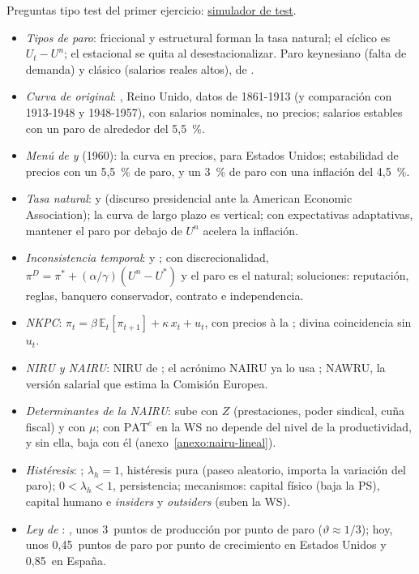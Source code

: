 \documentclass[11pt]{article}
\begin{document}
\begin{anotaciones}
Preguntas tipo test del primer ejercicio: \href{https://www.victorgutierrezmarcos.es/oposicion/temario/primer-ejercicio/test/simulador.html?tema=3.A.28}{simulador de test}.
\end{anotaciones}

\begin{itemize}
\item \emph{Tipos de paro}: friccional y estructural forman la tasa natural; el cíclico es $U_t-U^n$; el estacional se quita al desestacionalizar. Paro keynesiano (falta de demanda) y clásico (salarios reales altos), de .
\item \emph{Curva de  original}: \textcite{Phillips1958}, Reino Unido, datos de 1861-1913 (y comparación con 1913-1948 y 1948-1957), con salarios nominales, no precios; salarios estables con un paro de alrededor del 5,5~\%.
\item \emph{Menú de  y } (1960): la curva en precios, para Estados Unidos; estabilidad de precios con un 5,5~\% de paro, y un 3~\% de paro con una inflación del 4,5~\%.
\item \emph{Tasa natural}: \textcite{Phelps1967Phillips} y \textcite{Friedman1968Role} (discurso presidencial ante la American Economic Association); la curva de largo plazo es vertical; con expectativas adaptativas, mantener el paro por debajo de $U^n$ acelera la inflación.
\item \emph{Inconsistencia temporal}: \textcite{KydlandPrescott1977Rules} y \textcite{BarroGordon1983Positive}; con discrecionalidad, $\pi^D=\pi^*+(\alpha/\gamma)(U^n-U^*)$ y el paro es el natural; soluciones: reputación, reglas, banquero conservador\nocite{Rogoff1985Optimal}, contrato\nocite{Walsh1995Optimal} e independencia.
\item \emph{NKPC}: $\pi_t=\beta\,\mathbb{E}_t[\pi_{t+1}]+\kappa\,x_t+u_t$, con precios à la ; divina coincidencia sin $u_t$\nocite{BlanchardGali2007Real}.
\item \emph{NIRU y NAIRU}: NIRU de \textcite{ModiglianiPapademos1975Targets}; el acrónimo NAIRU ya lo usa \textcite{Tobin1980Stabilization}; NAWRU, la versión salarial que estima la Comisión Europea.
\item \emph{Determinantes de la NAIRU}: sube con $Z$ (prestaciones, poder sindical, cuña fiscal) y con $\mu$; con $\mathrm{PAT}^e$ en la WS no depende del nivel de la productividad, y sin ella, baja con él (anexo~\ref{anexo:nairu-lineal}).
\item \emph{Histéresis}: \textcite{BlanchardSummers1986Hysteresis}; $\lambda_h=1$, histéresis pura (paseo aleatorio, importa la variación del paro); $0<\lambda_h<1$, persistencia; mecanismos: capital físico (baja la PS), capital humano e \emph{insiders} y \emph{outsiders} (suben la WS).
\item \emph{Ley de }: \textcite{Okun1962}, unos 3~puntos de producción por punto de paro ($\vartheta\approx1/3$); hoy, unos 0,45~puntos de paro por punto de crecimiento en Estados Unidos y 0,85~en España\nocite{Ball2017Okun}.
\end{itemize}

\bibliografia
\end{document}
